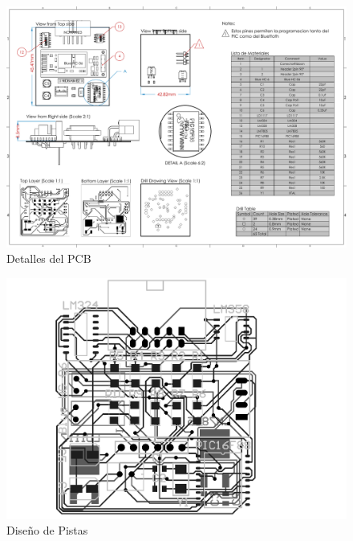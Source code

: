\begin{figure}[H]
\centering
\includegraphics[width=1\textwidth]{./Documentos_PDF/Detalle_PCB.pdf}
\caption{Detalles del PCB}
\label{fig:PCB_Detalles}
\end{figure}

\begin{figure}[H]
\centering
\includegraphics[width=1\textwidth]{./Documentos_PDF/Pistas_PCB.pdf}
\caption{Diseño de Pistas}
\label{fig:Pistas_PCB}
\end{figure}

